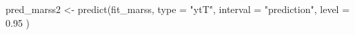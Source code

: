 \begin{Schunk}
\begin{Sinput}
 pred_marss2 <- predict(fit_marss,
   type = "ytT",
   interval = "prediction", level = 0.95
 )
\end{Sinput}
\end{Schunk}

